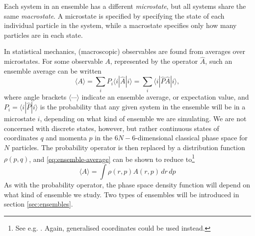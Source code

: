 \documentclass[11pt,bibliography=totoc,index=totoc]{scrbook}   %
\begin{document}
Each system in an ensemble has a different \emph{microstate}, but all systems share the same \emph{macrostate}.
A microstate is specified by specifying the state of each individual particle in the system,
while a macrostate specifies only how many particles are in each state.

In statistical mechanics, (macroscopic) observables are found from averages over microstates.
For some observable $A$, represented by the operator $\hat{A}$, such an ensemble average can be written
\begin{equation}
  \langle A \rangle = \sum_i P_i \langle i | \hat{A} | i\rangle = \sum_i \langle i | \hat{P} \hat{A} | i \rangle,
  \label{eq:ensemble-average}
\end{equation}
where angle brackets $\langle \cdots \rangle$ indicate an ensemble average, or expectation value,
and $P_i = \langle i | \hat{P} | i \rangle$ is the probability that any given system in the ensemble will be in a microstate $i$,
depending on what kind of ensemble we are simulating.
We are not concerned with discrete states, however, but rather continuous states of coordinates $q$ and momenta $p$ in the $6N-6$-dimensional classical phase space for $N$ particles.
The probability operator is then replaced by a distribution function $\rho(p,q)$, 
and \eqref{eq:ensemble-average} can be shown to reduce to\footnote{See e.g. \cite[13-15]{Frenkel:1996}.
    Again, generalised coordinates could be used instead.
}
\begin{equation}
  \langle A \rangle = \int \rho(r,p) A(r,p)\,dr\,dp 
  \label{eq:configuration-int}
\end{equation}
As with the probability operator, the phase space density function will depend on what kind of ensemble we study.
Two types of ensembles will be introduced in section \ref{sec:ensembles}.


\end{document}
